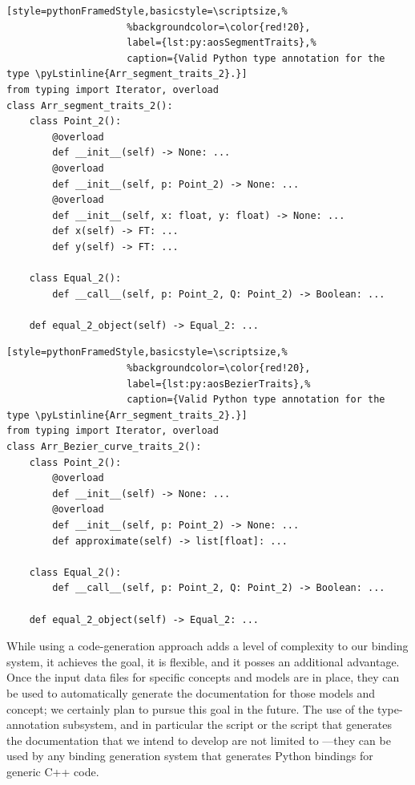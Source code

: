 \begin{lstfloat}
  \begin{lstlisting}[style=pythonFramedStyle,basicstyle=\scriptsize,%
                     %backgroundcolor=\color{red!20},
                     label={lst:py:aosSegmentTraits},%
                     caption={Valid Python type annotation for the type \pyLstinline{Arr_segment_traits_2}.}]
from typing import Iterator, overload
class Arr_segment_traits_2():
    class Point_2():
        @overload
        def __init__(self) -> None: ...
        @overload
        def __init__(self, p: Point_2) -> None: ...
        @overload
        def __init__(self, x: float, y: float) -> None: ...
        def x(self) -> FT: ...
        def y(self) -> FT: ...

    class Equal_2():
        def __call__(self, p: Point_2, Q: Point_2) -> Boolean: ...

    def equal_2_object(self) -> Equal_2: ...
  \end{lstlisting}
\end{lstfloat}

\begin{lstfloat}
  \begin{lstlisting}[style=pythonFramedStyle,basicstyle=\scriptsize,%
                     %backgroundcolor=\color{red!20},
                     label={lst:py:aosBezierTraits},%
                     caption={Valid Python type annotation for the type \pyLstinline{Arr_segment_traits_2}.}]
from typing import Iterator, overload
class Arr_Bezier_curve_traits_2():
    class Point_2():
        @overload
        def __init__(self) -> None: ...
        @overload
        def __init__(self, p: Point_2) -> None: ...
        def approximate(self) -> list[float]: ...

    class Equal_2():
        def __call__(self, p: Point_2, Q: Point_2) -> Boolean: ...

    def equal_2_object(self) -> Equal_2: ...
  \end{lstlisting}
\end{lstfloat}

While using a code-generation approach adds a level of complexity to
our binding system, it achieves the goal, it is flexible, and it
posses an additional advantage. Once the input data files for specific
concepts and models are in place, they can be used to automatically
generate the documentation for those models and concept; we certainly
plan to pursue this goal in the future. The use of the type-annotation
subsystem, and in particular the  script or
the script that generates the documentation that we intend to develop
are not limited to \cgal{}---they can be used by any binding
generation system that generates Python bindings for generic C++ code.
